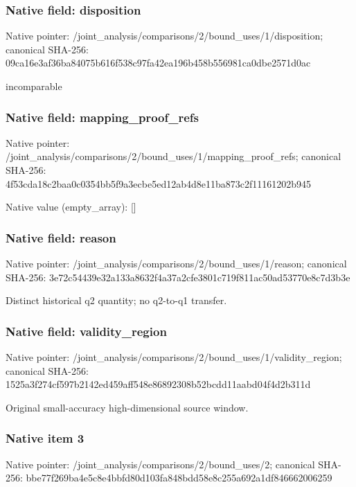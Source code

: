 \documentclass[10pt,a4paper]{article}
\begin{document}
\subsubsection{Native field: disposition}
Native pointer: /joint\_\allowbreak{}analysis/comparisons/2/bound\_\allowbreak{}uses/1/disposition; canonical SHA-256: 09ca16e3af36ba84075b616f538c97fa42ea196b458b556981ca0dbe2571d0ac

\begingroup\raggedright\sloppy incomparable\par\endgroup

\subsubsection{Native field: mapping\_\allowbreak{}proof\_\allowbreak{}refs}
Native pointer: /joint\_\allowbreak{}analysis/comparisons/2/bound\_\allowbreak{}uses/1/mapping\_\allowbreak{}proof\_\allowbreak{}refs; canonical SHA-256: 4f53cda18c2baa0c0354bb5f9a3ecbe5ed12ab4d8e11ba873c2f11161202b945

Native value (empty\_\allowbreak{}array): []

\subsubsection{Native field: reason}
Native pointer: /joint\_\allowbreak{}analysis/comparisons/2/bound\_\allowbreak{}uses/1/reason; canonical SHA-256: 3e72c54439e32a133a8632f4a37a2cfe3801c719f811ac50ad53770e8c7d3b3e

\begingroup\raggedright\sloppy Distinct historical q2 quantity;\allowbreak{} no q2-to-q1 transfer.\par\endgroup

\subsubsection{Native field: validity\_\allowbreak{}region}
Native pointer: /joint\_\allowbreak{}analysis/comparisons/2/bound\_\allowbreak{}uses/1/validity\_\allowbreak{}region; canonical SHA-256: 1525a3f274cf597b2142ed459aff548e86892308b52bcdd11aabd04f4d2b311d

\begingroup\raggedright\sloppy Original small-accuracy high-dimensional source window.\par\endgroup

\subsubsection{Native item 3}
Native pointer: /joint\_\allowbreak{}analysis/comparisons/2/bound\_\allowbreak{}uses/2; canonical SHA-256: bbe77f269ba4e5c8e4bbfd80d103fa848bdd58e8c255a692a1df846662006259
\end{document}
